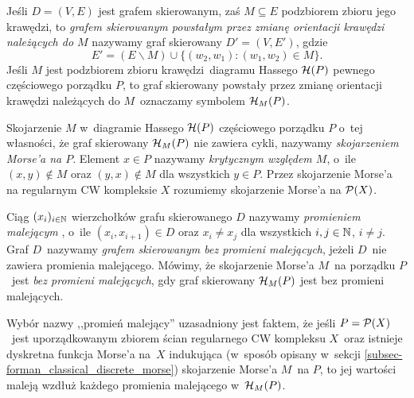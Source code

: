 Jeśli $D=(V,E)$ jest grafem skierowanym, zaś $M\subseteq E$ podzbiorem zbioru jego krawędzi, to \textit{grafem skierowanym powstałym przez zmianę orientacji krawędzi należących do $M$} nazywamy graf skierowany $D'=(V,E')$, gdzie \[E'=(E\smallsetminus M)\cup\{(w_2,w_1):(w_1,w_2)\in M\}.\] Jeśli $M$ jest podzbiorem zbioru krawędzi~diagramu Hassego $\mathcal{H}(P)$ pewnego częściowego porządku $P$, to graf skierowany powstały przez zmianę orientacji krawędzi należących do $M$~oznaczamy symbolem $\mathcal{H}_M(P)$.

Skojarzenie $M$ w~diagramie Hassego $\mathcal{H}(P)$ częściowego porządku $P$ o~tej własności, że graf skierowany $\mathcal{H}_M(P)$ nie zawiera cykli, nazywamy \textit{skojarzeniem Morse'a na $P$}. Element $x\in P$ nazywamy \textit{krytycznym względem $M$}, o~ile $(x,y)\not\in M$ oraz $(y,x)\not\in M$ dla wszystkich $y\in P$. Przez skojarzenie Morse'a na regularnym CW kompleksie $X$ rozumiemy skojarzenie Morse'a na $\mathcal{P}(X)$.

Ciąg $(x_i)_{i\in\mathbb{N}}$ wierzchołków grafu skierowanego $D$ nazywamy \textit{promieniem malejącym} \cite{Ayala11}, o~ile $(x_i,x_{i+1})\in D$ oraz $x_i\not=x_j$ dla wszystkich $i,j\in\mathbb{N}$, $i\not=j$. Graf $D$~nazywamy \textit{grafem skierowanym bez promieni malejących}, jeżeli $D$~nie zawiera promienia malejącego. Mówimy, że skojarzenie Morse'a $M$~na porządku $P$~jest \textit{bez promieni malejących}, gdy graf skierowany $\mathcal{H}_M(P)$ jest bez promieni malejących. 

Wybór nazwy ,,promień malejący'' uzasadniony jest faktem, że jeśli $P=\mathcal{P}(X)$~jest uporządkowanym zbiorem ścian regularnego CW kompleksu $X$~oraz istnieje dyskretna funkcja Morse'a na~$X$ indukująca (w~sposób opisany w~sekcji \ref{subsec-forman_classical_discrete_morse}) skojarzenie Morse'a $M$~na $P$, to jej wartości maleją wzdłuż każdego promienia malejącego w~$\mathcal{H}_M(P)$.

